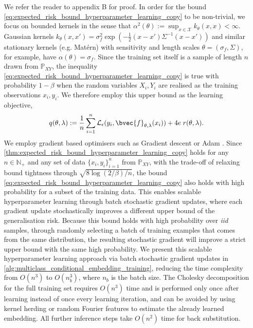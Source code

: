 \documentclass[twoside]{article}
\begin{document}
		We refer the reader to appendix B for proof. In order for the bound \eqref{eq:expected_risk_bound_hyperparameter_learning_copy} to be non-trivial, we focus on bounded kernels in the sense that $\alpha^{2}(\theta) := \sup_{x \in \mathcal{X}} k_{\theta}(x, x) < \infty$. Gaussian kernels $k_{\theta}(x, x') = \sigma_{f}^{2} \exp{( - \frac{1}{2}(x - x') \Sigma^{-1} (x - x') )}$ and similar stationary kernels (e.g. Mat\'{e}rn) with sensitivity and length scales $\theta = (\sigma_{f}, \Sigma)$, for example, have $\alpha(\theta) = \sigma_{f}$. Since the training set itself is a sample of length $n$ drawn from $\mathbb{P}_{X Y}$, the inequality \eqref{eq:expected_risk_bound_hyperparameter_learning_copy} is true with probability $1 - \beta$ when the random variables $X_{i}, Y_{i}$ are realised as the training observations $x_{i}, y_{i}$. We therefore employ this upper bound as the learning objective,
		\begin{equation}
		q(\theta, \lambda) := \frac{1}{n} \sum_{i = 1}^{n} \mathcal{L}_{\epsilon}(y_{i}, \bvec{f}_{\theta, \lambda}(x_{i})) + 4 e \; r(\theta, \lambda).
		\label{eq:learning_objective}
		\end{equation}
		We employ gradient based optimisers such as Gradient descent or Adam \citep{kingma2014adam}. Since \cref{thm:expected_risk_bound_hyperparameter_learning_copy} holds for any $n \in \mathbb{N}_{+}$ and any set of data $\{x_{i}, y_{i}\}_{i = 1}^{n}$ from $\mathbb{P}_{X Y}$, with the trade-off of relaxing bound tightness through $\sqrt{8 \log{(2 / \beta)} / n}$, the bound \eqref{eq:expected_risk_bound_hyperparameter_learning_copy} also holds with high probability for a subset of the training data. This enables scalable hyperparameter learning through batch stochastic gradient updates, where each gradient update stochastically improves a different upper bound of the generalisation risk. Because this bound holds with high probability over \textit{iid} samples, through randomly selecting a batch of training examples that comes from the same distribution, the resulting stochastic gradient will improve a strict upper bound with the same high probability. We present this scalable hyperparameter learning approach via batch stochastic gradient updates in \cref{alg:multiclass_conditional_embedding_training}, reducing the time complexity from $O(n^{3})$ to $O(n_{b}^{3})$, where $n_{b}$ is the batch size. The Cholesky decomposition for the full training set requires $O(n^{3})$ time and is performed only once after learning instead of once every learning iteration, and can be avoided by using kernel herding \citep{chen2010super} or random Fourier features \citep{rahimi2008random} to estimate the already learned embedding. All further inference steps take $O(n^{2})$ time for back substitution. 
		
\end{document}
